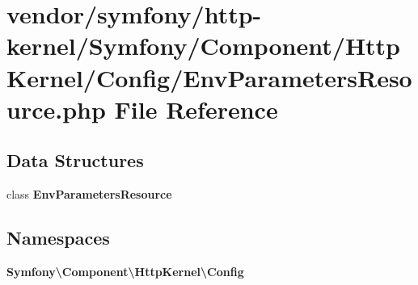 \section{vendor/symfony/http-\/kernel/\+Symfony/\+Component/\+Http\+Kernel/\+Config/\+Env\+Parameters\+Resource.php File Reference}
\label{_env_parameters_resource_8php}
\subsection*{Data Structures}
\begin{DoxyCompactItemize}
\item 
class {\bf Env\+Parameters\+Resource}
\end{DoxyCompactItemize}
\subsection*{Namespaces}
\begin{DoxyCompactItemize}
\item 
 {\bf Symfony\textbackslash{}\+Component\textbackslash{}\+Http\+Kernel\textbackslash{}\+Config}
\end{DoxyCompactItemize}
